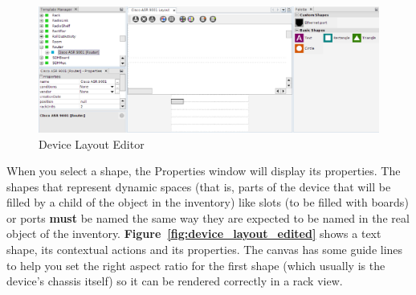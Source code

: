 \documentclass[a4paper]{article}
\begin{document}
	\begin{figure}[h!]
		\centering
		\includegraphics[width=0.99\linewidth]{img/device_layout_empty.png}
		\caption{Device Layout Editor}
		\label{fig:device_layout_empty}
	\end{figure}
	\newpage	
	
	When you select a shape, the Properties window will display its properties. The shapes that represent dynamic spaces (that is, parts of the device that will be filled by a child of the object in the inventory) like slots (to be filled with boards) or ports \textbf{must} be named the same way they are expected to be named in the real object of the inventory. \textbf{Figure~\ref{fig:device_layout_edited}} shows a text shape, its contextual actions and its properties. The canvas has some guide lines to help you set the right aspect ratio for the first shape (which usually is the device's chassis itself) so it can be rendered correctly in a rack view.
	
\end{document}
